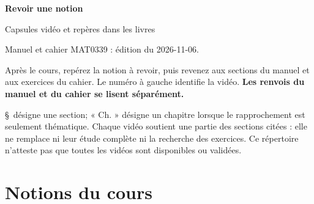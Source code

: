 \documentclass[11pt,a4paper]{article}
\begin{document}
{\color{ink}\Huge\bfseries Revoir une notion}\par
{\Large Capsules vidéo et repères dans les livres}\par


Manuel et cahier MAT0339 : édition du 2026-11-06.\par

Après le cours, repérez la notion à revoir, puis revenez aux sections du
manuel et aux exercices du cahier. Le numéro à gauche identifie la vidéo.
\textbf{Les renvois du manuel et du cahier se lisent séparément.}

\S\ désigne une section; « Ch. » désigne un chapitre lorsque le rapprochement
est seulement thématique. Chaque vidéo soutient une partie des sections citées :
elle ne remplace ni leur étude complète ni la recherche des exercices.
Ce répertoire n'atteste pas que toutes les vidéos sont disponibles ou validées.


\section*{Notions du cours}
\end{document}
